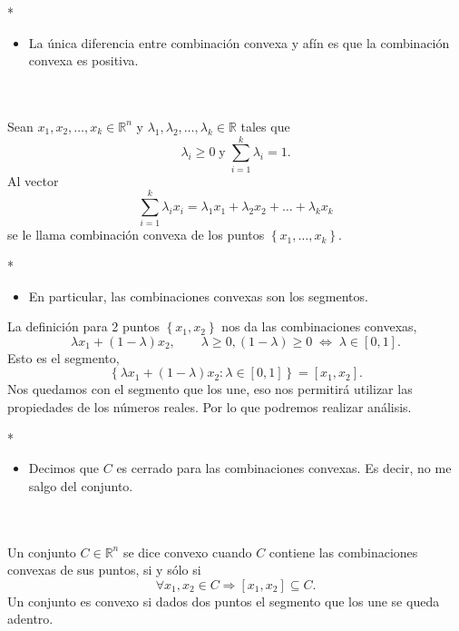 \begin{paracol}{2}
\switchcolumn[1]*{\noindent\scriptsize
\begin{itemize}
    \item La única diferencia entre combinación convexa y afín es que la combinación convexa es positiva.
\end{itemize}
}
\switchcolumn[0]\noindent
\begin{def.}\,\\\\
    Sean $x_1,x_2,\ldots,x_k\in \mathbb{R}^n$ y $\lambda_1,\lambda_2,\ldots,\lambda_k\in \mathbb{R}$ tales que 
    $$\lambda_i\geq 0\; \text{y} \;\displaystyle\sum_{i=1}^{k}\lambda_i=1.$$ 
    Al vector
    $$\sum_{i=1}^{k}\lambda_ix_i=\lambda_1x_1+\lambda_2x_2+\ldots+\lambda_kx_k$$
    se le llama combinación convexa de los puntos $\left\{x_1,\ldots,x_k\right\}$.
\end{def.}

\switchcolumn[1]*{\noindent\scriptsize
\begin{itemize}
    \item En particular, las combinaciones convexas son los segmentos.
\end{itemize}
}
\switchcolumn[0]\noindent
\begin{obs}
    La definición para 2 puntos $\left\{x_1,x_2\right\}$ nos da las combinaciones convexas,
    $$\lambda x_1+(1-\lambda)x_2,\qquad \lambda\geq 0, (1-\lambda)\geq 0 \; \Leftrightarrow \; \lambda \in \left[0,1\right].$$
    Esto es el segmento,
    $$\left\{\lambda x_1+(1-\lambda)x_2: \lambda\in \left[0,1\right]\right\}=\left[x_1,x_2\right].$$
    Nos quedamos con el segmento que los une, eso nos permitirá utilizar las propiedades de los números reales. Por lo que podremos realizar análisis.
\end{obs}

\switchcolumn[1]*{\noindent\scriptsize
\begin{itemize}
    \item Decimos que $C$ es cerrado para las combinaciones convexas. Es decir, no me salgo del conjunto.
\end{itemize}
}
\switchcolumn[0]\noindent
\begin{def.}[Convexo]\,\\\\
    Un conjunto $C\in \mathbb{R}^n$ se dice convexo cuando $C$ contiene las combinaciones convexas de sus puntos, si y sólo si
    $$\forall x_1,x_2\in C \Rightarrow \left[x_1,x_2\right]\subseteq C.$$
    Un conjunto es convexo si dados dos puntos el segmento que los une se queda adentro.
\end{def.}


\end{paracol}
